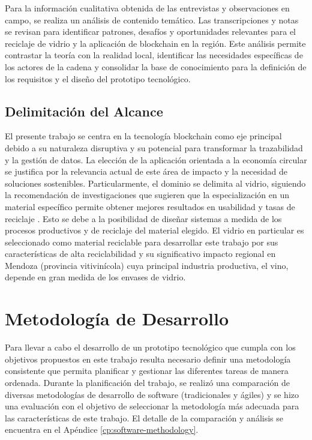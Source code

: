 Para la información cualitativa obtenida de las entrevistas y observaciones en campo, se realiza un análisis de contenido temático. Las transcripciones y notas se revisan para identificar patrones, desafíos y oportunidades relevantes para el reciclaje de vidrio y la aplicación de blockchain en la región. Este análisis permite contrastar la teoría con la realidad local, identificar las necesidades específicas de los actores de la cadena y consolidar la base de conocimiento para la definición de los requisitos y el diseño del prototipo tecnológico.

\subsection{Delimitación del Alcance}

El presente trabajo se centra en la tecnología blockchain como eje principal debido a su naturaleza disruptiva y su potencial para transformar la trazabilidad y la gestión de datos. La elección de la aplicación orientada a la economía circular se justifica por la relevancia actual de este área de impacto y la necesidad de soluciones sostenibles. Particularmente, el dominio se delimita al vidrio, siguiendo la recomendación de investigaciones que sugieren que la especialización en un material específico permite obtener mejores resultados en usabilidad y tasas de reciclaje \cite{pending}. Esto se debe a la posibilidad de diseñar sistemas a medida de los procesos productivos y de reciclaje del material elegido. El vidrio en particular es seleccionado como material reciclable para desarrollar este trabajo por sus características de alta reciclabilidad y su significativo impacto regional en Mendoza (provincia vitivinícola) cuya principal industria productiva, el vino, depende en gran medida de los envases de vidrio. %

\section{Metodología de Desarrollo}
\label{sec:software-method}

Para llevar a cabo el desarrollo de un prototipo tecnológico que cumpla con los objetivos propuestos en este trabajo resulta necesario definir una metodología consistente que permita planificar y gestionar las diferentes tareas de manera ordenada. Durante la planificación del trabajo, se realizó una comparación de diversas metodologías de desarrollo de software (tradicionales y ágiles) y se hizo una evaluación con el objetivo de seleccionar la metodología más adecuada para las características de este trabajo. El detalle de la comparación y análisis se encuentra en el Apéndice \ref{cp:software-methodology}. 

